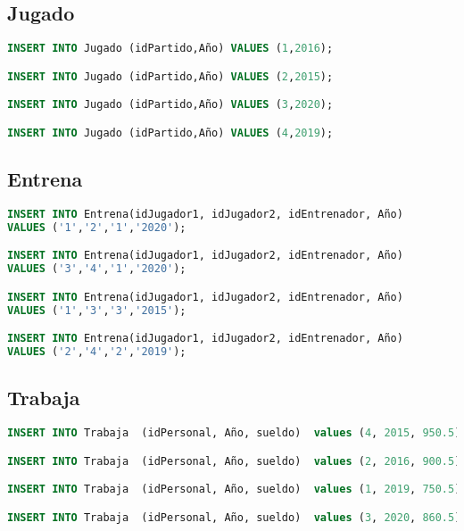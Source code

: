 \subsection{Jugado}
\begin{lstlisting}[language=sql]
INSERT INTO Jugado (idPartido,Año) VALUES (1,2016);

INSERT INTO Jugado (idPartido,Año) VALUES (2,2015);

INSERT INTO Jugado (idPartido,Año) VALUES (3,2020);

INSERT INTO Jugado (idPartido,Año) VALUES (4,2019);
\end{lstlisting}

\subsection{Entrena}
\begin{lstlisting}[language=sql]
INSERT INTO Entrena(idJugador1, idJugador2, idEntrenador, Año)
VALUES ('1','2','1','2020');

INSERT INTO Entrena(idJugador1, idJugador2, idEntrenador, Año)
VALUES ('3','4','1','2020');

INSERT INTO Entrena(idJugador1, idJugador2, idEntrenador, Año)
VALUES ('1','3','3','2015');

INSERT INTO Entrena(idJugador1, idJugador2, idEntrenador, Año)
VALUES ('2','4','2','2019');
\end{lstlisting}

\subsection{Trabaja}
\begin{lstlisting}[language=sql]
INSERT INTO Trabaja  (idPersonal, Año, sueldo)  values (4, 2015, 950.5);

INSERT INTO Trabaja  (idPersonal, Año, sueldo)  values (2, 2016, 900.5);

INSERT INTO Trabaja  (idPersonal, Año, sueldo)  values (1, 2019, 750.5);

INSERT INTO Trabaja  (idPersonal, Año, sueldo)  values (3, 2020, 860.5);
\end{lstlisting}

